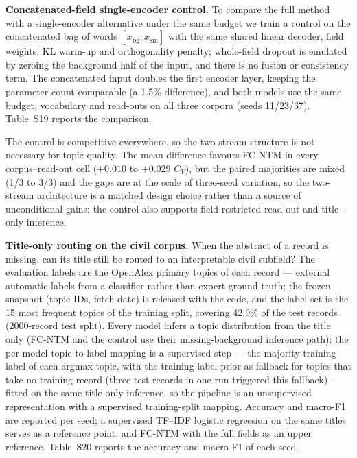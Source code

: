 \documentclass[Journal,letterpaper,NoLists]{ascelike-new}
\newcommand{\fcntm}{FC-NTM}
\begin{document}
\noindent\textbf{Concatenated-field single-encoder control.} To compare the full method with a single-encoder alternative under the same budget we train a
control on the concatenated bag of words $[x_{\mathrm{bg}};x_{\mathrm{sm}}]$ with the same shared
linear decoder, field weights, KL warm-up and orthogonality penalty; whole-field dropout is
emulated by zeroing the background half of the input, and there is no fusion or consistency
term. The concatenated input doubles the first encoder layer, keeping the parameter count
comparable (a 1.5\% difference), and both models use the same budget, vocabulary and read-outs
on all three corpora (seeds 11/23/37).
Table~S19 reports the comparison.

The control is competitive everywhere, so the two-stream structure is not necessary for topic
quality. The mean difference favours \fcntm{} in every corpus--read-out cell ($+0.010$ to
$+0.029$ $C_V$), but the paired majorities are mixed (1/3 to 3/3) and the gaps are at the scale of
three-seed variation, so the two-stream architecture is a matched design choice rather than a
source of unconditional gains; the control also supports field-restricted read-out and title-only
inference.

\noindent\textbf{Title-only routing on the civil corpus.} When the abstract of a record is missing, can its title still be routed to an interpretable civil
subfield? The evaluation labels are the OpenAlex primary topics of each record --- external
automatic labels from a classifier rather than expert ground truth; the frozen snapshot (topic
IDs, fetch date) is released with the code, and the label set is the 15 most frequent topics of
the training split, covering 42.9\% of the test records (2000-record test split). Every model
infers a topic distribution from the title only (\fcntm{} and the control use their
missing-background inference path); the per-model topic-to-label mapping is a supervised step ---
the majority training label of each argmax topic, with the training-label prior as fallback for
topics that take no training record (three test records in one run triggered this fallback) ---
fitted on the same title-only inference, so the pipeline is an unsupervised representation with
a supervised training-split mapping. Accuracy and
macro-F1 are reported per seed; a supervised TF--IDF logistic regression on the same titles
serves as a reference point, and \fcntm{} with the full fields as an upper reference.
Table~S20 reports the accuracy and macro-F1 of each seed.
\end{document}
